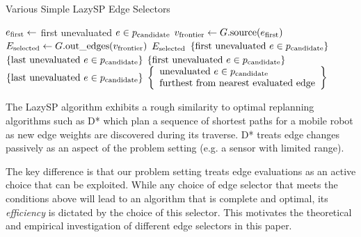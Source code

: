 \begin{algorithm}[t]
\caption{Various Simple LazySP Edge Selectors}
\begin{algorithmic}[1]
   \State $e_{\mbox{\scriptsize first}} \leftarrow$ first unevaluated $e \in p_{\mbox{\scriptsize candidate}}$
   \State $v_{\mbox{\scriptsize frontier}} \leftarrow G.\mbox{source}(e_{\mbox{\scriptsize first}})$
   \State $E_{\mbox{\scriptsize selected}} \leftarrow G.\mbox{out\_edges}(v_{\mbox{\scriptsize frontier}})$
   \State \Return $E_{\mbox{\scriptsize selected}}$
\EndFunction
\vspace{0.02in}
   \State \Return $\{ \mbox{first unevaluated } e \in p_{\mbox{\scriptsize candidate}} \}$
\EndFunction
\vspace{0.02in}
   \State \Return $\{ \mbox{last unevaluated } e \in p_{\mbox{\scriptsize candidate}} \}$
\EndFunction
\vspace{0.02in}
      \State \Return $\{ \mbox{first unevaluated } e \in p_{\mbox{\scriptsize candidate}} \}$
   \Else
      \State \Return $\{ \mbox{last unevaluated } e \in p_{\mbox{\scriptsize candidate}} \}$
   \EndIf
\EndFunction
\vspace{0.02in}
   \State \Return $\left\{ \begin{array}{ll}
      \mbox{unevaluated } e \in p_{\mbox{\scriptsize candidate}} \\
      \mbox{furthest from nearest evaluated edge}
      \end{array} \right\}$
\EndFunction
\end{algorithmic}
\label{alg:simple-selectors}
\end{algorithm}


The LazySP algorithm exhibits a rough similarity to optimal
replanning algorithms such as
D* \citep{stentz1994dstar}
which plan a sequence of shortest paths for a mobile robot
as new edge weights are discovered during its traverse.
D* treats edge changes
passively as an aspect of the problem setting
(e.g. a sensor with limited range).

The key difference is that our problem setting treats 
edge evaluations as an active choice that can be exploited.
While any choice of edge selector that meets the conditions above
will lead to an algorithm that is complete and optimal,
its \emph{efficiency} is dictated by the choice of this
selector.
This motivates the theoretical and empirical investigation of different
edge selectors in this paper.

